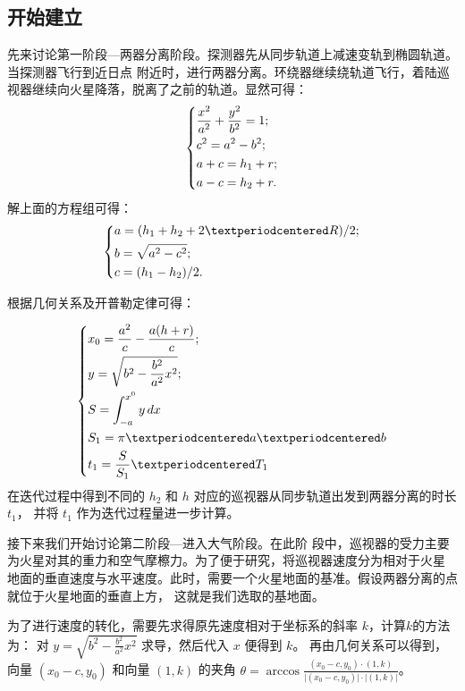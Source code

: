 \documentclass[hyperref,a4paper,UTF8]{ctexart}
\begin{document}
\subsection{开始建立}
先来讨论第一阶段---两器分离阶段。探测器先从同步轨道上减速变轨到椭圆轨道。当探测器飞行到近日点
附近时，进行两器分离。环绕器继续绕轨道飞行，着陆巡视器继续向火星降落，脱离了之前的轨道。显然可得：
\[
    \begin{dcases}
        \frac{x^2}{a^2} + \frac{y^2}{b^2} = 1 ; \\
        c^2 = a^2 - b^2;                        \\
        a + c = h_1 + r;                        \\
        a - c = h_2 + r.                        \\
    \end{dcases}
\]
解上面的方程组可得：
\[
    \begin{dcases}
        a = (h_1 + h_2 + 2·R) / 2; \\
        b = \sqrt{a^2 - c^2};      \\
        c = (h_1 - h_2) / 2.       \\
    \end{dcases}
\]

\noindent 根据几何关系及开普勒定律可得：

\[
    \begin{dcases}
        x_0 = \frac{a^2}{c} - \frac{a(h + r)}{c}; \\
        y = \sqrt{b^2 - \frac{b^2}{a^2}x^2};      \\
        S = \int_{-a}^{x^0} y \,dx                \\
        S_1 = \pi · a · b                         \\
        t_1 = \frac{S}{S_1} · T_1
    \end{dcases}
\]
在迭代过程中得到不同的 $h_2$ 和 $h$ 对应的巡视器从同步轨道出发到两器分离的时长 $t_1$，
并将 $t_1$ 作为迭代过程量进一步计算。

\medskip
\bigskip
接下来我们开始讨论第二阶段---进入大气阶段。在此阶
段中，巡视器的受力主要为火星对其的重力和空气摩檫力。为了便于研究，将巡视器速度分为相对于火星
地面的垂直速度与水平速度。此时，需要一个火星地面的基准。假设两器分离的点就位于火星地面的垂直上方，
这就是我们选取的基地面。

为了进行速度的转化，需要先求得原先速度相对于坐标系的斜率 $k$，计算$k$的方法为：
对 $y = \sqrt{b^2 - \frac{b^2}{a^2}x^2}$ 求导，然后代入 $x$ 便得到 $k$。
再由几何关系可以得到，向量 $(x_0 - c, y_0)$ \smallskip 和向量 $(1,k)$ 的夹角 $\theta = \arccos
    \frac{\displaystyle (x_0 - c, y_0)·(1,k)}{\displaystyle\vert (x_0 - c, y_0)\vert \cdot |(1,k)|} $。
\end{document}
